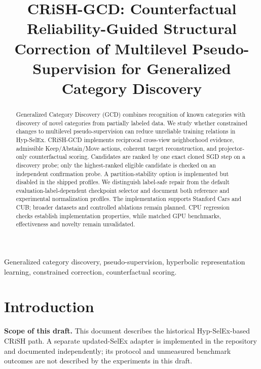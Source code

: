 \documentclass[conference]{IEEEtran}
\begin{document}
\title{CRiSH-GCD: Counterfactual Reliability-Guided Structural Correction of Multilevel Pseudo-Supervision for Generalized Category Discovery}
\author{
\and
{}
}
\maketitle

\begin{abstract}
Generalized Category Discovery (GCD) combines recognition of known categories with discovery of novel categories from partially labeled data. We study whether constrained changes to multilevel pseudo-supervision can reduce unreliable training relations in Hyp-SelEx. CRiSH-GCD implements reciprocal cross-view neighborhood evidence, admissible Keep/Abstain/Move actions, coherent target reconstruction, and projector-only counterfactual scoring. Candidates are ranked by one exact cloned SGD step on a discovery probe; only the highest-ranked eligible candidate is checked on an independent confirmation probe. A partition-stability option is implemented but disabled in the shipped profiles. We distinguish label-safe repair from the default evaluation-label-dependent checkpoint selector and document both reference and experimental normalization profiles. The implementation supports Stanford Cars and CUB; broader datasets and controlled ablations remain planned. CPU regression checks establish implementation properties, while matched GPU benchmarks, effectiveness and novelty remain unvalidated.
\end{abstract}
\begin{IEEEkeywords}
Generalized category discovery, pseudo-supervision, hyperbolic representation learning, constrained correction, counterfactual scoring.
\end{IEEEkeywords}

\section{Introduction}
\noindent\textbf{Scope of this draft.} This document describes the historical Hyp-SelEx-based CRiSH path. A separate updated-SelEx adapter is implemented in the repository and documented independently; its protocol and unmeasured benchmark outcomes are not described by the experiments in this draft.
\end{document}
